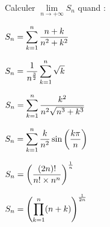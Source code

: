 \documentclass[a4paper, 11pt,reqno]{article}
\begin{document}
%
%
\begin{exercice}  \;
	Calculer $\lim\limits_{n\to +\infty} S_n$ quand :\\
	\begin{enumerate}
		\begin{minipage}[t]{0.45\textwidth}
			\item $S_n=\displaystyle \sum\limits_{k=1}^n \displaystyle\frac{n+k}{n^2+k^2}$
			\item $S_n=\displaystyle\frac{1}{n^{\frac{3}{2}}} \sum\limits_{k=1}^{n}\sqrt{k}$
			\item $S_n=\displaystyle \sum\limits_{k=1}^n \displaystyle\frac{k^2}{n^2\sqrt{n^3+k^3}}$
		\end{minipage}
		\begin{minipage}[t]{0.45\textwidth}
			\item $S_n=\displaystyle \sum\limits_{k=1}^n \displaystyle\frac{k}{n^2}\sin{\left(\displaystyle\frac{k\pi}{n}\right)}$
			\item $S_n=\displaystyle\left( \displaystyle\frac{(2n)!}{n! \times n^n} \right)^{\frac{1}{n}}$
			\item $S_n=\displaystyle\left( \prod\limits_{k=1}^n (n+k)  \right)^{\frac{1}{2n}}$
		\end{minipage}
	\end{enumerate}
\end{exercice}
\end{document}
